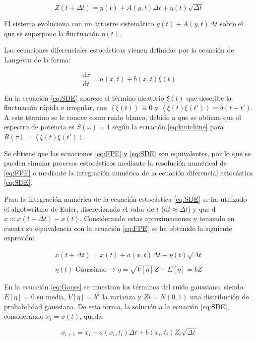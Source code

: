 	\begin{equation}
		Z(t+\Delta t) = y(t) + A(y, t)\Delta t + \eta(t) \sqrt{\Delta t}
	\end{equation}

El sistema evoluciona con un arrastre sistem\'atico $y(t) + A(y, t)\Delta t$ sobre el que se superpone la fluctuaci\'on $\eta(t)$.

Las ecuaciones diferenciales estoc\'asticas vienen definidas por la ecuaci\'on de Langevin de la forma:

	\begin{equation}
		\frac{\mathrm{d} x}{\mathrm{d} t} = a(x, t) + b(x, t) \xi(t)
		\label{eq:SDE}
	\end{equation}

	En la ecuaci\'on \ref{eq:SDE} aparece el t\'ermino aleatorio $\xi(t)$ que describe la fluctuaci\'on r\'apida e irregular, con $\left \langle \xi(t) \right \rangle \equiv 0$ y $\left \langle \xi(t)\xi(t') \right \rangle = \delta(t-t')$. A este t\'ermino se le conoce como ruido blanco, debido a que se obtiene que el espectro de potencia es $S(\omega) = 1$ seg\'un la ecuaci\'on \ref{eq:kintchine} para $R(\tau) = \left \langle \xi(t)\xi(t') \right \rangle$.

Se obtiene que las ecuaciones \ref{eq:FPE} y \ref{eq:SDE} son equivalentes, por lo que se pueden simular procesos estoc\'asticos mediante la resoluci\'on num\'erical de \ref{eq:FPE} o mediante la integraci\'on num\'erica de la ecuaci\'on diferencial estoc\'astica \ref{eq:SDE}. 

Para la integraci\'on num\'erica de la ecuaci\'on estoc\'astica \ref{eq:SDE} se ha utilizado el algot=ritmo de Euler, discretizando el valor de $t$ (d$t \approx \Delta t$) y que d$x \approx x(t+\Delta t) - x(t)$. Considerando estas aproximaciones y teniendo en cuenta su equivalencia con la ecuaci\'on \ref{eq:FPE} se ha obtenido la siguiente expresi\'on:

	\begin{equation}
		\begin{matrix}
		x(t+\Delta t) = x(t) + a(x, t)\Delta t + \eta(t)\sqrt{\Delta t} \\ \\
		\eta(t) \textrm{ Gaussiano} \rightarrow \eta = \sqrt{V[\eta]} Z + E[\eta] = bZ
		\end{matrix}
		\label{eq:Gauss}
	\end{equation}

	En la ecuaci\'on \ref{eq:Gauss} se muestran los t\'erminos del ruido gaussiano, siendo $E[\eta] = 0$ su media, $V[\eta] = b^2$ la varianza y $Zi = N(0, 1)$ una distribuci\'on de probabilidad gaussiana. De esta forma, la soluci\'on a la ecuaci\'on \ref{eq:SDE}, considerando $x_i = x(t)$, queda:

	\begin{equation}
		x_{i+1} = x_i + a(x_i, t_i)\Delta t + b(x_i, t_i) Z_i\sqrt{\Delta t}
	\end{equation}
